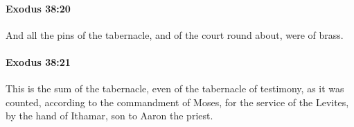 		\paragraph{Exodus 38:20} %
			\label{EXODUS-38-20}

			And all the pins of the tabernacle, and of the court round about, were of brass.


		\paragraph{Exodus 38:21} %
			\label{EXODUS-38-21}

			This is the sum of the tabernacle, even of the tabernacle of testimony, as it was counted, according to the commandment of Moses, for the service of the Levites, by the hand of Ithamar, son to Aaron the priest.


